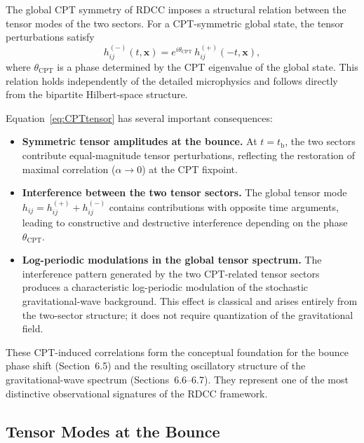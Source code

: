 \documentclass[11pt,a4paper]{article}
\begin{document}
The global CPT symmetry of RDCC imposes a structural relation between the tensor
modes of the two sectors. For a CPT-symmetric global state, the tensor
perturbations satisfy
\begin{equation}
    h^{(-)}_{ij}(t,\mathbf{x})
    = e^{i\theta_{\mathrm{CPT}}}\,
      h^{(+)}_{ij}(-t,\mathbf{x}),
    \label{eq:CPTtensor}
\end{equation}
where \(\theta_{\mathrm{CPT}}\) is a phase determined by the CPT eigenvalue of the
global state. This relation holds independently of the detailed microphysics and
follows directly from the bipartite Hilbert-space structure.

Equation~\eqref{eq:CPTtensor} has several important consequences:

\begin{itemize}
    \item \textbf{Symmetric tensor amplitudes at the bounce.}
    At \(t = t_{\mathrm{b}}\), the two sectors contribute equal-magnitude tensor
    perturbations, reflecting the restoration of maximal correlation
    (\(\alpha \to 0\)) at the CPT fixpoint.

    \item \textbf{Interference between the two tensor sectors.}
    The global tensor mode \(h_{ij} = h^{(+)}_{ij} + h^{(-)}_{ij}\) contains
    contributions with opposite time arguments, leading to constructive and
    destructive interference depending on the phase \(\theta_{\mathrm{CPT}}\).

    \item \textbf{Log-periodic modulations in the global tensor spectrum.}
    The interference pattern generated by the two CPT-related tensor sectors
    produces a characteristic log-periodic modulation of the stochastic
    gravitational-wave background. This effect is classical and arises entirely
    from the two-sector structure; it does not require quantization of the
    gravitational field.
\end{itemize}

These CPT-induced correlations form the conceptual foundation for the bounce
phase shift (Section~6.5) and the resulting oscillatory structure of the
gravitational-wave spectrum (Sections~6.6–6.7). They represent one of the most
distinctive observational signatures of the RDCC framework.

\subsection{Tensor Modes at the Bounce}
\end{document}
